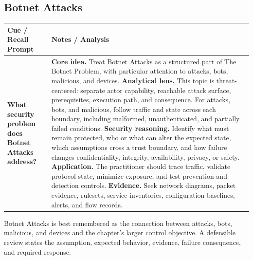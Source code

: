 \documentclass[11pt]{article}
\newcommand{\CornellHeader}{%
\rowcolor{Navy}\color{white}\bfseries Cue / Recall Prompt & \color{white}\bfseries Notes / Analysis\\\hline}
\newcommand{\CornellRow}[2]{%
\cellcolor{CueGray}\RaggedRight\textbf{#1} & \RaggedRight #2\\\hline}
\begin{document}
\subsection*{Botnet Attacks}
\begin{longtable}{>{\RaggedRight\arraybackslash}p{}|>{\RaggedRight\arraybackslash}p{}}
\CornellHeader
\CornellRow{What security problem does Botnet Attacks address?}{\textbf{Core idea.} Treat Botnet Attacks as a structured part of The Botnet Problem, with particular attention to attacks, bots, malicious, and devices. \textbf{Analytical lens.} This topic is threat-centered: separate actor capability, reachable attack surface, prerequisites, execution path, and consequence. For attacks, bots, and malicious, follow traffic and state across each boundary, including malformed, unauthenticated, and partially failed conditions. \textbf{Security reasoning.} Identify what must remain protected, who or what can alter the expected state, which assumptions cross a trust boundary, and how failure changes confidentiality, integrity, availability, privacy, or safety. \textbf{Application.} The practitioner should trace traffic, validate protocol state, minimize exposure, and test prevention and detection controls. \textbf{Evidence.} Seek network diagrams, packet evidence, rulesets, service inventories, configuration baselines, alerts, and flow records.}
\end{longtable}
\begin{topicsummary}
Botnet Attacks is best remembered as the connection between attacks, bots, malicious, and devices and the chapter's larger control objective. A defensible review states the assumption, expected behavior, evidence, failure consequence, and required response.
\end{topicsummary}
\end{document}
